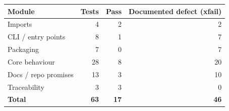 \begin{tabular}{@{}lrrr@{}}
\toprule
\textbf{Module} & \textbf{Tests} & \textbf{Pass} & \textbf{Documented defect (xfail)}\\
\midrule
Imports & 4 & 2 & 2 \\
CLI / entry points & 8 & 1 & 7 \\
Packaging & 7 & 0 & 7 \\
Core behaviour & 28 & 8 & 20 \\
Docs / repo promises & 13 & 3 & 10 \\
Traceability & 3 & 3 & 0 \\
\midrule
\textbf{Total} & \textbf{63} & \textbf{17} & \textbf{46} \\
\bottomrule
\end{tabular}
